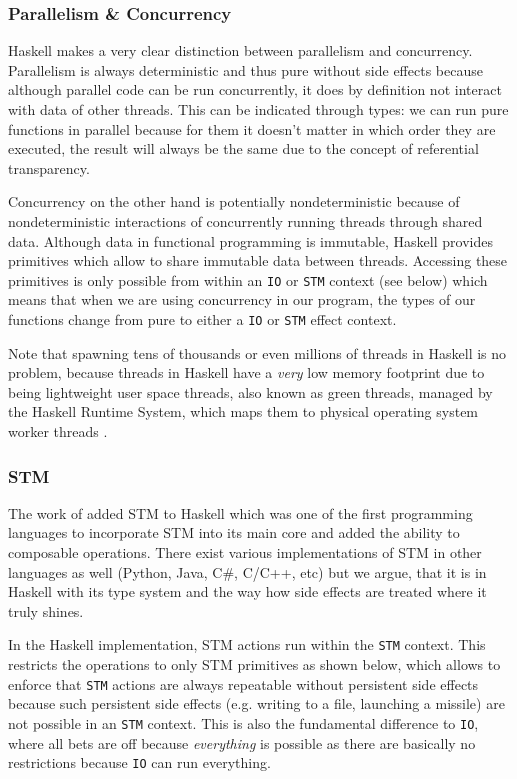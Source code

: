 \subsubsection{Parallelism \& Concurrency}
Haskell makes a very clear distinction between parallelism and concurrency. Parallelism is always deterministic and thus pure without side effects because although parallel code can be run concurrently, it does by definition not interact with data of other threads. This can be indicated through types: we can run pure functions in parallel because for them it doesn't matter in which order they are executed, the result will always be the same due to the concept of referential transparency.

Concurrency on the other hand is potentially nondeterministic because of nondeterministic interactions of concurrently running threads through shared data. Although data in functional programming is immutable, Haskell provides primitives which allow to share immutable data between threads. Accessing these primitives is only possible from within an \texttt{IO} or \texttt{STM} context (see below) which means that when we are using concurrency in our program, the types of our functions change from pure to either a \texttt{IO} or \texttt{STM} effect context.

Note that spawning tens of thousands or even millions of threads in Haskell is no problem, because threads in Haskell have a \textit{very} low memory footprint due to being lightweight user space threads, also known as green threads, managed by the Haskell Runtime System, which maps them to physical operating system worker threads \cite{marlow_runtime_2009}.

\subsubsection{STM}
The work of \cite{harris_composable_2005, harris_transactional_2006} added STM to Haskell which was one of the first programming languages to incorporate STM into its main core and added the ability to composable operations. There exist various implementations of STM in other languages as well (Python, Java, C\#, C/C++, etc) but we argue, that it is in Haskell with its type system and the way how side effects are treated where it truly shines.

In the Haskell implementation, STM actions run within the \texttt{STM} context. This restricts the operations to only STM primitives as shown below, which allows to enforce that \texttt{STM} actions are always repeatable without persistent side effects because such persistent side effects (e.g. writing to a file, launching a missile) are not possible in an \texttt{STM} context. This is also the fundamental difference to  \texttt{IO}, where all bets are off because \textit{everything} is possible as there are basically no restrictions because \texttt{IO} can run everything.

